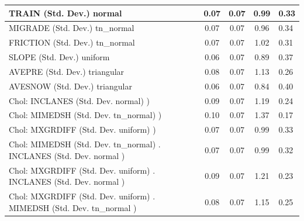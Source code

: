 \begin{table}
\begin{center}
\begin{tabular}{|l|l|c|c|c|l|}
			\hline
			TRAIN (Std. Dev.) normal &  & 0.07 & 0.07 & 0.99 & 0.33 \\
			\hline
			MIGRADE (Std. Dev.) tn_normal &  & 0.07 & 0.07 & 0.96 & 0.34 \\
			\hline
			FRICTION (Std. Dev.) tn_normal &  & 0.07 & 0.07 & 1.02 & 0.31 \\
			\hline
			SLOPE (Std. Dev.) uniform &  & 0.06 & 0.07 & 0.89 & 0.37 \\
			\hline
			AVEPRE (Std. Dev.) triangular &  & 0.08 & 0.07 & 1.13 & 0.26 \\
			\hline
			AVESNOW (Std. Dev.) triangular &  & 0.06 & 0.07 & 0.84 & 0.40 \\
			\hline
			 Chol: INCLANES (Std. Dev. normal) ) &  & 0.09 & 0.07 & 1.19 & 0.24 \\
			\hline
			 Chol: MIMEDSH (Std. Dev. tn_normal) ) &  & 0.10 & 0.07 & 1.37 & 0.17 \\
			\hline
			 Chol: MXGRDIFF (Std. Dev. uniform) ) &  & 0.07 & 0.07 & 0.99 & 0.33 \\
			\hline
			 Chol: MIMEDSH (Std. Dev. tn_normal) . INCLANES (Std. Dev.   normal ) &  & 0.07 & 0.07 & 0.99 & 0.32 \\
			\hline
			 Chol: MXGRDIFF (Std. Dev. uniform) . INCLANES (Std. Dev.   normal ) &  & 0.09 & 0.07 & 1.21 & 0.23 \\
			\hline
			 Chol: MXGRDIFF (Std. Dev. uniform) . MIMEDSH (Std. Dev.   tn_normal ) &  & 0.08 & 0.07 & 1.15 & 0.25 \\
			\hline
		\end{tabular}
	\end{center}
\end{table}